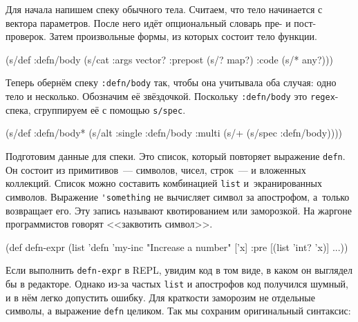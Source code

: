 Для начала напишем спеку обычного тела. Считаем, что тело начинается с вектора
параметров. После него идёт опциональный словарь пре- и пост-проверок. Затем
произвольные формы, из которых состоит тело функции.

\begin{english}
  \begin{clojure}
(s/def :defn/body
  (s/cat :args vector?
         :prepost (s/? map?)
         :code (s/* any?)))
  \end{clojure}
\end{english}

Теперь обернём спеку \verb|:defn/body| так, чтобы она учитывала оба
случая: одно тело и несколько. Обозначим её звёздочкой. Поскольку
\verb|:defn/body| это \verb|regex|-спека, сгруппируем её с помощью
\verb|s/spec|.

\begin{english}
  \begin{clojure}
(s/def :defn/body*
  (s/alt :single :defn/body
         :multi (s/+ (s/spec :defn/body))))
  \end{clojure}
\end{english}


Подготовим данные для спеки. Это список, который повторяет выражение
\verb|defn|. Он состоит из примитивов~--- символов, чисел, строк~--- и вложенных
коллекций. Список можно составить комбинацией \verb|list| и~экранированных
символов. Выражение \verb|'something| не вычисляет символ за апострофом,
а~только возвращает его. Эту запись называют квотированием  или
заморозкой. На жаргоне программистов говорят <<заквотить символ>>.

\begin{english}
  \begin{clojure}
(def defn-expr
  (list 'defn 'my-inc
        "Increase a number"
        ['x]
        {:pre [(list 'int? 'x)]} ...))
  \end{clojure}
\end{english}

Если выполнить \verb|defn-expr| в REPL, увидим код в том виде, в каком он
выглядел бы в редакторе. Однако из-за частых \verb|list| и апострофов код
получился шумный, и в нём легко допустить ошибку. Для краткости заморозим не
отдельные символы, а выражение \verb|defn| целиком. Так мы сохраним оригинальный
синтаксис:

\begin{english}
\end{english}

